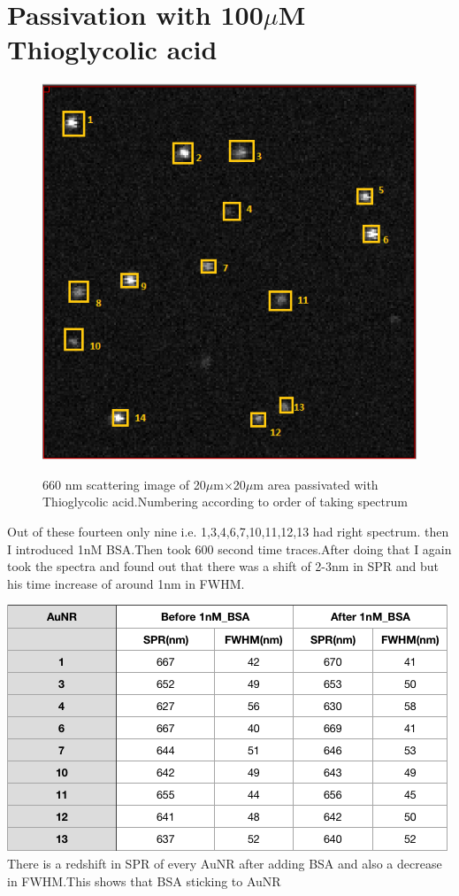 \documentclass[twoside,single]{lion-msc}
\begin{document}
\section{Passivation with 100$\mu$M Thioglycolic acid}
\begin{figure}[H]
\includegraphics[width=.6\textwidth,center]{6.png}\\
\caption {660 nm scattering image of 20$\mu$m$\times$20$\mu$m area passivated with Thioglycolic acid.Numbering according to order of taking spectrum}
\end{figure}
Out of these fourteen only nine i.e. 1,3,4,6,7,10,11,12,13 had right spectrum.
then I introduced 1nM BSA.Then took 600 second time traces.After doing that I again took the spectra and found out that there was a shift of 2-3nm in SPR and but his time increase of around 1nm in FWHM.
\begin{table}[H]
\includegraphics[scale=.6]{5.png}\\
\caption {There is a redshift in SPR of every AuNR after adding BSA and also a decrease in FWHM.This shows that BSA sticking to AuNR}
\end{table}
\end{document}
